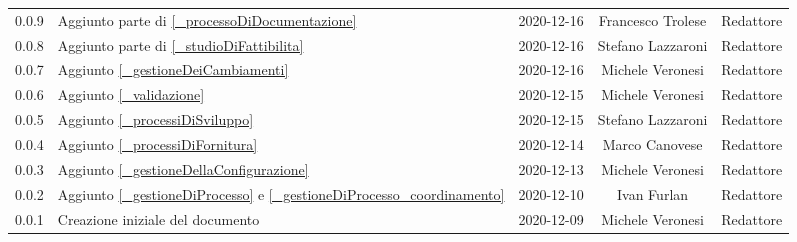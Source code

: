 \begin{center}
\begin{longtable}{|c|p{5cm}|c|c|c|}
		0.0.9 & Aggiunto parte di \ref{_processoDiDocumentazione} & 2020-12-16 & Francesco Trolese & Redattore \\
		0.0.8 & Aggiunto parte di \ref{_studioDiFattibilita} & 2020-12-16 & Stefano Lazzaroni & Redattore \\
		0.0.7 & Aggiunto \ref{_gestioneDeiCambiamenti} & 2020-12-16 & Michele Veronesi & Redattore \\
		0.0.6 & Aggiunto \ref{_validazione} & 2020-12-15 & Michele Veronesi & Redattore \\
		0.0.5 & Aggiunto \ref{_processiDiSviluppo} & 2020-12-15 & Stefano Lazzaroni & Redattore \\
		0.0.4 & Aggiunto \ref{_processiDiFornitura} & 2020-12-14 & Marco Canovese & Redattore \\
		0.0.3 & Aggiunto \ref{_gestioneDellaConfigurazione} & 2020-12-13 & Michele Veronesi & Redattore \\
		0.0.2 & Aggiunto \ref{_gestioneDiProcesso} e \ref{_gestioneDiProcesso_coordinamento} & 2020-12-10 & Ivan Furlan & Redattore \\
		0.0.1 & Creazione iniziale del documento & 2020-12-09 & Michele Veronesi & Redattore \\
		
		\hline
	\end{longtable}
\end{center}